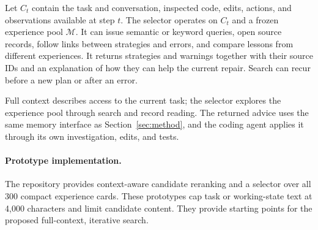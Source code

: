 Let $C_t$ contain the task and conversation, inspected code, edits, actions,
and observations available at step $t$. The selector operates on $C_t$ and
a frozen experience pool $\mathcal{M}$. It can issue semantic or keyword
queries, open source records, follow links between strategies and errors,
and compare lessons from different experiences. It returns strategies and
warnings together with their source IDs and an explanation of how they can
help the current repair. Search can recur before a new plan or after an error.

Full context describes access to the current task; the selector explores
the experience pool through search and record reading. The returned advice
uses the same memory interface as Section~\ref{sec:method}, and the coding
agent applies it through its own investigation, edits, and tests.

\paragraph{Prototype implementation.}
The repository provides context-aware candidate reranking and a selector
over all 300 compact experience cards. These prototypes cap task or
working-state text at 4,000 characters and limit candidate content. They
provide starting points for the proposed full-context, iterative search.
